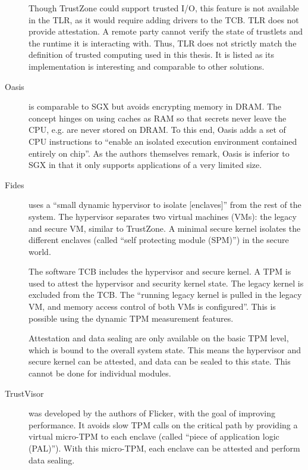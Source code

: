 \begin{description}
Though TrustZone could support trusted I/O, this feature is not available in the TLR, as it would require adding drivers to the TCB.\label{ID_813431600}
TLR does not provide attestation. A remote party cannot verify the state of trustlets and the runtime it is interacting with. Thus, TLR does not strictly match the definition of trusted computing used in this thesis. It is listed as its implementation is interesting and comparable to other solutions.\label{ID_1734052719}
\item[Oasis\cite{Owusu2013}]\label{ID_1097915963}
is comparable to SGX but avoids encrypting memory in DRAM.\label{ID_1149911880}
The concept hinges on using caches as RAM so that secrets never leave the CPU, e.g. are never stored on DRAM.\label{ID_479354751}
To this end, Oasis adds a set of CPU instructions to ``enable an isolated execution environment contained entirely on chip''.\label{ID_269399808}
As the authors themselves remark, Oasis is inferior to SGX in that it only supports applications of a very limited size.\label{ID_1544780564}
\item[Fides\cite{Strackx2012}]\label{ID_1573635887}
uses a ``small dynamic hypervisor to isolate [enclaves]'' from the rest of the system. The hypervisor separates two virtual machines (VMs): the legacy and secure VM, similar to TrustZone.\label{ID_99725932}
A minimal secure kernel isolates the different enclaves (called ``self protecting module (SPM)'') in the secure world.\label{ID_1045769233}

The software TCB includes the hypervisor and secure kernel.\label{ID_1212833812}
A TPM is used to attest the hypervisor and security kernel state.\label{ID_391511184}
The legacy kernel is excluded from the TCB. The ``running legacy kernel is pulled in the legacy VM, and memory access control of both VMs is configured''. This is possible using the dynamic TPM measurement features.\label{ID_1472841998}

Attestation and data sealing are only available on the basic TPM level, which is bound to the overall system state. This means the hypervisor and secure kernel can be attested, and data can be sealed to this state. This cannot be done for individual modules.\label{ID_577386957}
\item[TrustVisor\cite{McCune2010}]\label{ID_1338218613}
was developed by the authors of Flicker, with the goal of improving performance.\label{ID_1509697723}
It avoids slow TPM calls on the critical path by providing a virtual micro-TPM to each enclave (called ``piece of application logic (PAL)''). With this micro-TPM, each enclave can be attested and perform data sealing.\label{ID_448665960}


\end{description}
